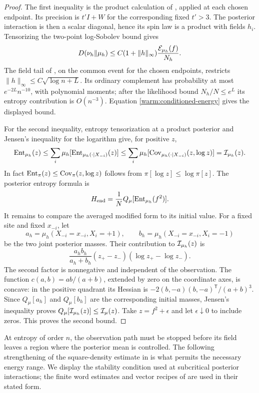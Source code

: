 \begin{proof}
The first inequality is the product calculation of
\cite[Equation~(19.18)]{CM}, applied at each chosen endpoint.
Its precision is \(t'I+W\) for the corresponding fixed \(t'>3\).
The posterior interaction is then a scalar diagonal, hence its spin
law is a product with fields \(h_i\).  Tensorizing the two-point
log-Sobolev bound gives
\[
 D(\nu_h\Vert\mu_h)
 \le C(1+\|h\|_\infty)\frac{\mathcal E_{\mu_h}(f)}{N_h}.
\]
The field tail of \cite[Equation~(19.10)]{CM}, on the common event for
the chosen endpoints, restricts
\(\|h\|_\infty\le C\sqrt{\log n+L}\).  Its ordinary complement has
probability at most \(e^{-2L}n^{-10}\), with polynomial moments;
after the likelihood bound \(N_h/N\le e^L\) its entropy contribution
is \(O(n^{-3})\).  Equation \eqref{warm:conditioned-energy} gives the
displayed bound.

For the second inequality, entropy tensorization at a product posterior
and Jensen's inequality for the logarithm give, for positive \(z\),
\[
 \operatorname{Ent}_{\mu_h}(z)
 \le\sum_i\mu_h[\operatorname{Ent}_{\mu_h(\cdot\mid X_{-i})}(z)]
 \le\sum_i\mu_h[\operatorname{Cov}_{\mu_h(\cdot\mid X_{-i})}(z,\log z)]
 =\mathcal I_{\mu_h}(z).
\]
In fact \(\operatorname{Ent}_\pi(z)\le\operatorname{Cov}_\pi(z,\log z)\) follows from
\(\pi[\log z]\le\log\pi[z]\).  The posterior entropy formula is
\[
 H_{\rm end}=\frac1N Q_\mu[\operatorname{Ent}_{\mu_h}(f^2)].
\]
It remains to compare the averaged modified form to its initial value.
For a fixed site and fixed \(x_{-i}\), let
\[
 a_h=\mu_h(X_{-i}=x_{-i},X_i=+1),\qquad
 b_h=\mu_h(X_{-i}=x_{-i},X_i=-1)
\]
be the two joint posterior masses.  Their contribution to
\(\mathcal I_{\mu_h}(z)\) is
\[
 \frac{a_hb_h}{a_h+b_h}
       (z_+-z_-)(\log z_+-\log z_-).
\]
The second factor is nonnegative and independent of the observation.
The function \(c(a,b)=ab/(a+b)\), extended by zero on the coordinate
axes, is concave: in the positive quadrant its Hessian is
\(-2(b,-a)(b,-a)^{\mathsf T}/(a+b)^3\).
Since \(Q_\mu[a_h]\) and \(Q_\mu[b_h]\) are the corresponding
initial masses, Jensen's inequality proves
\(Q_\mu[\mathcal I_{\mu_h}(z)]\le\mathcal I_\mu(z)\).
Take \(z=f^2+\epsilon\) and let \(\epsilon\downarrow0\) to include
zeros.  This proves the second bound.
\end{proof}

At entropy of order \(n\), the observation path must be stopped before
its field leaves a region where the posterior mean is controlled.
The following strengthening of the square-density estimate in
\cite[Proposition~7.3]{SG} is what permits the necessary energy range.
We display the stability condition used at subcritical posterior
interactions; the finite word estimates and vector recipes of \cite{SG}
are used in their stated form.

